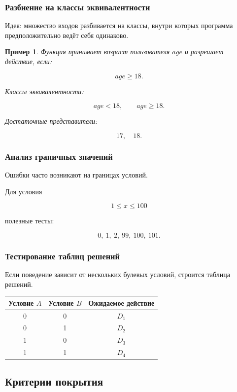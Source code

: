 \documentclass[12pt,a4paper]{article}
\newtheorem{example}{Пример}
\begin{document}
\subsubsection{Разбиение на классы эквивалентности}

Идея: множество входов разбивается на классы, внутри которых программа предположительно ведёт себя одинаково.

\begin{example}
Функция принимает возраст пользователя $age$ и разрешает действие, если:

\[
age \ge 18.
\]

Классы эквивалентности:

\[
age < 18,\qquad age \ge 18.
\]

Достаточные представители:

\[
17,\quad 18.
\]
\end{example}

\subsubsection{Анализ граничных значений}

Ошибки часто возникают на границах условий.

Для условия

\[
1 \le x \le 100
\]

полезные тесты:

\[
0,\ 1,\ 2,\ 99,\ 100,\ 101.
\]

\subsubsection{Тестирование таблиц решений}

Если поведение зависит от нескольких булевых условий, строится таблица решений.

\begin{center}
\begin{tabular}{c c c}
\toprule
Условие $A$ & Условие $B$ & Ожидаемое действие \\
\midrule
0 & 0 & $D_1$ \\
0 & 1 & $D_2$ \\
1 & 0 & $D_3$ \\
1 & 1 & $D_4$ \\
\bottomrule
\end{tabular}
\end{center}

\subsection{Критерии покрытия}
\end{document}
